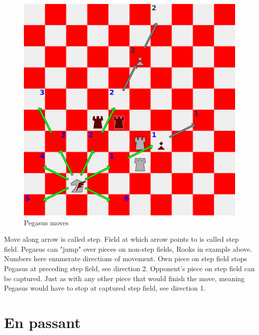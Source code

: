 \documentclass[a5paper,12pt,draft]{book} %
\begin{document}
\noindent
\begin{figure}[!t]
\includegraphics[width=1.0\textwidth, keepaspectratio=true]{../gfx/examples/03_move_pegasus.png}
\caption{Pegasus moves}
\label{fig:pegasus_moves}
\end{figure}
Move along arrow is called step. Field at which arrow points to is called step field.
Pegasus can "jump" over pieces on non-step fields, Rooks in example above. Numbers
here enumerate directions of movement. Own piece on step field stops Pegasus at
preceding step field, see direction 2. Opponent's piece on step field can be captured.
Just as with any other piece that would finish the move, meaning Pegasus would have to
stop at captured step field, see direction 1.

\clearpage

\section*{En passant}
\end{document}
